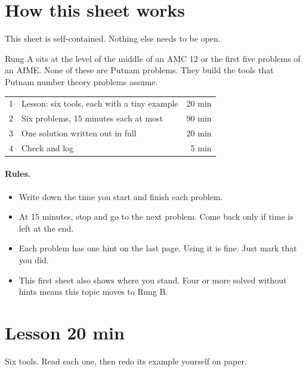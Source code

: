 \documentclass[11pt]{article}
\begin{document}

\section*{How this sheet works}

This sheet is self-contained. Nothing else needs to be open.

Rung A sits at the level of the middle of an AMC 12 or the first five problems of an AIME. None of these are Putnam problems. They build the tools that Putnam number theory problems assume.

\begin{center}
\begin{tabular}{llr}
\hline
1 & Lesson: six tools, each with a tiny example & 20 min \\
2 & Six problems, 15 minutes each at most & 90 min \\
3 & One solution written out in full & 20 min \\
4 & Check and log & 5 min \\
\hline
\end{tabular}
\end{center}

\paragraph{Rules.}
\begin{itemize}
  \item Write down the time you start and finish each problem.
  \item At 15 minutes, stop and go to the next problem. Come back only if time is left at the end.
  \item Each problem has one hint on the last page. Using it is fine. Just mark that you did.
  \item This first sheet also shows where you stand. Four or more solved without hints means this topic moves to Rung B.
\end{itemize}

\section{Lesson \hfill 20 min}

Six tools. Read each one, then redo its example yourself on paper.
\end{document}
